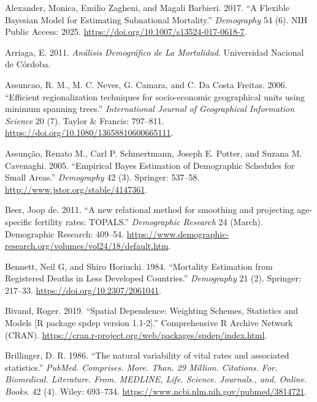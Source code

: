 \documentclass[12pt,]{article}
\begin{document}
\hypertarget{refs}{}
\leavevmode\hypertarget{ref-Alexander2017}{}%
Alexander, Monica, Emilio Zagheni, and Magali Barbieri. 2017. ``A
Flexible Bayesian Model for Estimating Subnational Mortality.''
\emph{Demography} 54 (6). NIH Public Access: 2025.
\url{https://doi.org/10.1007/s13524-017-0618-7}.

\leavevmode\hypertarget{ref-Arriaga2011}{}%
Arriaga, E. 2011. \emph{Análisis Demográfico de La Mortalidad}.
Universidad Nacional de Córdoba.

\leavevmode\hypertarget{ref-AssunCao2006}{}%
Assuncao, R. M., M. C. Neves, G. Camara, and C. Da Costa Freitas. 2006.
``Efficient regionalization techniques for socio-economic geographical
units using minimum spanning trees.'' \emph{International Journal of
Geographical Information Science} 20 (7). Taylor \& Francis: 797--811.
\url{https://doi.org/10.1080/13658810600665111}.

\leavevmode\hypertarget{ref-Assuncao2005}{}%
Assunção, Renato M., Carl P. Schmertmann, Joseph E. Potter, and Suzana
M. Cavenaghi. 2005. ``Empirical Bayes Estimation of Demographic
Schedules for Small Areas.'' \emph{Demography} 42 (3). Springer:
537--58. \url{http://www.jstor.org/stable/4147361}.

\leavevmode\hypertarget{ref-deBeer2011}{}%
Beer, Joop de. 2011. ``A new relational method for smoothing and
projecting age-specific fertility rates: TOPALS.'' \emph{Demographic
Research} 24 (March). Demographic Research: 409--54.
\url{https://www.demographic-research.org/volumes/vol24/18/default.htm}.

\leavevmode\hypertarget{ref-Bennett_Horiuchi_1984}{}%
Bennett, Neil G, and Shiro Horiuchi. 1984. ``Mortality Estimation from
Registered Deaths in Less Developed Countries.'' \emph{Demography} 21
(2). Springer: 217--33. \url{https://doi.org/10.2307/2061041}.

\leavevmode\hypertarget{ref-Bivand2019}{}%
Bivand, Roger. 2019. ``Spatial Dependence: Weighting Schemes, Statistics
and Models {[}R package spdep version 1.1-2{]}.'' Comprehensive R
Archive Network (CRAN).
\url{https://cran.r-project.org/web/packages/spdep/index.html}.

\leavevmode\hypertarget{ref-Brillinger1986}{}%
Brillinger, D. R. 1986. ``The natural variability of vital rates and
associated statistics.'' \emph{PubMed. Comprises. More. Than. 29
Million. Citations. For. Biomedical. Literature. From. MEDLINE, Life.
Science. Journals., and. Online. Books.} 42 (4). Wiley: 693--734.
\url{https://www.ncbi.nlm.nih.gov/pubmed/3814721}.
\end{document}
